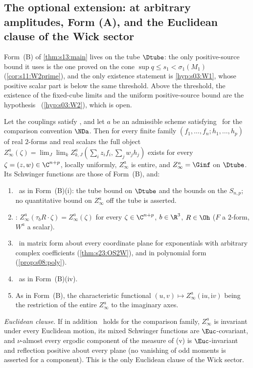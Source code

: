 \subsection{The optional extension: \texorpdfstring{\Wtwo}{(W2)} at arbitrary amplitudes, Form (A), and the Euclidean clause of the Wick sector}

Form~(B) of \cref{thm:s13:main} lives on the tube $\Dtube$: the only positive-source bound it uses is the one proved on the cone $\sup q\le s_1<\sigma_1(M_1)$ (\cref{cor:s11:W2prime}), and the only existence statement is \cref{hyp:s03:W1}, whose positive scalar part is below the same threshold. Above the threshold, the existence of the fixed-cube limits and the uniform positive-source bound are the hypothesis \Wtwo\ (\cref{hyp:s03:W2}), which is open.

\begin{theorem}\label{thm:s23:FormA}
Let the couplings satisfy \Tthree, and let $a$ be an admissible scheme satisfying \Wtwo\ for the comparison convention $\NDa$. Then for every finite family $(f_1,\dots,f_n;h_1,\dots,h_p)$ of real $2$-forms and real scalars the full object $Z^a_\infty(\zeta)=\lim_J\lim_kZ^a_{k,J}(\sum_iz_if_i,\sum_jw_jh_j)$ exists for every $\zeta=(z,w)\in\C^{n+p}$, locally uniformly, $Z^a_\infty$ is entire, and $Z^a_\infty=\Ginf$ on $\Dtube$. Its Schwinger functions are those of Form~(B), and:
\begin{enumerate}[label=\textup{(\roman*)},leftmargin=*,nosep]
\item \OSz\ as in Form~(B)(i): the tube bound on $\Dtube$ and the bounds on the $S_{n,p}$; no quantitative bound on $Z^a_\infty$ off the tube is asserted.
\item \OSo: $Z^a_\infty(\tau_bR\cdot\zeta)=Z^a_\infty(\zeta)$ for every $\zeta\in\C^{n+p}$, $b\in\R^3$, $R\in\Oh$ ($F$ a $2$-form, $W^a$ a scalar).
\item \OSt\ in matrix form about every coordinate plane for exponentials with arbitrary complex coefficients (\cref{thm:s23:OS2W}), and in polynomial form (\cref{prop:s08:poly}).
\item \OSth\ as in Form~(B)(iv).
\item[\textup{(v),(vi)}] As in Form~(B), the characteristic functional $(u,v)\mapsto Z^a_\infty(\mathrm iu,\mathrm iv)$ being the restriction of the entire $Z^a_\infty$ to the imaginary axes.
\end{enumerate}
\emph{Euclidean clause.} If in addition \RW\ holds for the comparison family, $Z^a_\infty$ is invariant under every Euclidean motion, its mixed Schwinger functions are $\Euc$-covariant, and $\nu$-almost every ergodic component of the measure of (v) is $\Euc$-invariant and reflection positive about every plane (no vanishing of odd moments is asserted for a component). This is the only Euclidean clause of the Wick sector.


\end{theorem}
